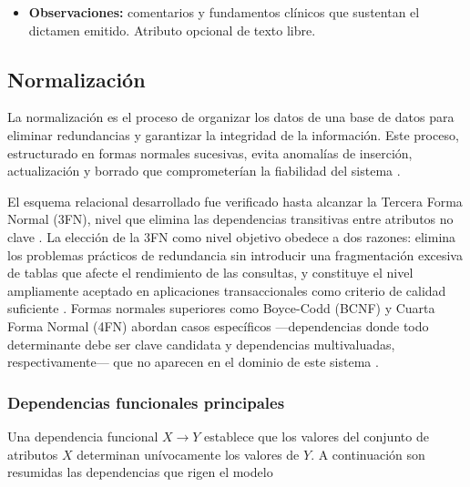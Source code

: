 \begin{itemize}
\begin{itemize}
        \item \textbf{Evento esperado:} reacción ya documentada en el perfil de seguridad de la vacuna.
        \item \textbf{Serio o potencialmente mortal:} evento que pone en riesgo la vida del sujeto.
        \item \textbf{Evento menor:} reacción leve sin repercusión clínica significativa.
    \end{itemize}
    \item \textbf{Observaciones:} comentarios y fundamentos clínicos que sustentan el dictamen emitido. Atributo opcional de texto libre.
\end{itemize}



\subsection{Normalización}

La normalización es el proceso de organizar los datos de una base de datos para eliminar redundancias y garantizar la integridad de la información. 
Este proceso, estructurado en formas normales sucesivas, evita anomalías de inserción, actualización y borrado que comprometerían la fiabilidad del sistema \cite{codd1970}.

El esquema relacional desarrollado fue verificado hasta alcanzar la Tercera Forma Normal (3FN), nivel que elimina las dependencias transitivas entre atributos no clave \cite{codd1971}. 
La elección de la 3FN como nivel objetivo obedece a dos razones: elimina los problemas prácticos de redundancia sin introducir una fragmentación excesiva de tablas que afecte el rendimiento de las consultas, y constituye el nivel ampliamente aceptado en aplicaciones transaccionales como criterio de calidad suficiente \cite{date2012}.
Formas normales superiores como Boyce-Codd (BCNF) y Cuarta Forma Normal (4FN) abordan casos específicos —dependencias donde todo determinante debe ser clave candidata y dependencias multivaluadas, respectivamente— que no aparecen en el dominio de este sistema \cite{silberschatz2019}.

\subsubsection*{Dependencias funcionales principales}

Una dependencia funcional $X \rightarrow Y$ establece que los valores del conjunto de atributos $X$ determinan unívocamente los valores de $Y$. 
A continuación son resumidas las dependencias que rigen el modelo

